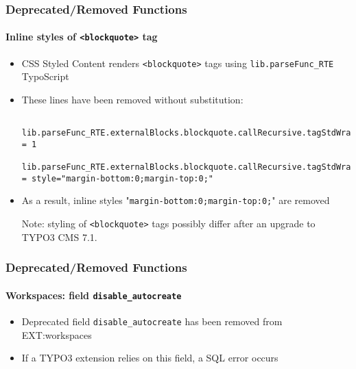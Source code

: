 \begin{frame}[fragile]
	\frametitle{Deprecated/Removed Functions}
	\framesubtitle{Inline styles of \texttt{<blockquote>} tag}

	\lstset{basicstyle=\tiny\ttfamily}

	\begin{itemize}

		\item CSS Styled Content renders \texttt{<blockquote>} tags using \texttt{lib.parseFunc\_RTE} TypoScript
		\item These lines have been removed without substitution:

			\begin{lstlisting}
				lib.parseFunc_RTE.externalBlocks.blockquote.callRecursive.tagStdWrap.HTMLparser = 1
				lib.parseFunc_RTE.externalBlocks.blockquote.callRecursive.tagStdWrap.HTMLparser.tags.blockquote.overrideAttribs = style="margin-bottom:0;margin-top:0;"
			\end{lstlisting}

		\item As a result, inline styles "\texttt{margin-bottom:0;margin-top:0;}"\newline
			are removed

			\vspace{0.2cm}

			\begingroup
				\color{red}
					Note: styling of \texttt{<blockquote>} tags possibly differ after an
					upgrade to TYPO3 CMS 7.1.
			\endgroup

	\end{itemize}

\end{frame}


\begin{frame}[fragile]
	\frametitle{Deprecated/Removed Functions}
	\framesubtitle{Workspaces: field \texttt{disable\_autocreate}}

	\begin{itemize}
		\item Deprecated field \texttt{disable\_autocreate} has been removed from EXT:workspaces
		\item If a TYPO3 extension relies on this field, a SQL error occurs
	\end{itemize}

\end{frame}

